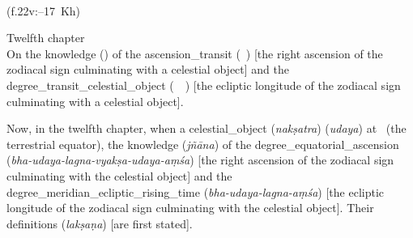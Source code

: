 \begin{multicols}{2}
\noindent\reversemarginpar{}%
\columnbreak

\noindent\normalmarginpar{}%
 ~\\
(f.\thinspace 22v:--17~Kh)
\end{multicols}%
%
\begin{multicols}{2}
Twelfth chapter\\
On the \gls{knowledge} (\marifat) of the \gls{ascension_transit} (\matali\idafaconsonant\ \mamarr) [\ie the right ascension of the zodiacal sign culminating with a celestial object] and the \gls{degree_transit_celestial_object} (\daraji\idafavowel\ \mamarr\idafaconsonant\ \kawkab) [\ie the ecliptic longitude of the zodiacal sign culminating with a celestial object].
\columnbreak

Now, in the twelfth chapter, when a \gls{celestial_object} (\textit{nakṣatra})  (\textit{udaya}) at \Lanka\ (the terrestrial equator), the \gls{knowledge} (\textit{jñāna}) of the \gls{degree_equatorial_ascension} (\textit{bha-udaya-lagna-vyakṣa-udaya-aṃśa}) [\ie the right ascension of the zodiacal sign culminating with the celestial object] and the \gls{degree_meridian_ecliptic_rising_time} (\textit{bha-udaya-lagna-aṃśa}) [\ie the ecliptic longitude of the zodiacal sign culminating with the celestial object]. Their \glspl{definition} (\textit{lakṣaṇa}) [are first stated]. 
\end{multicols}

\newpage %



